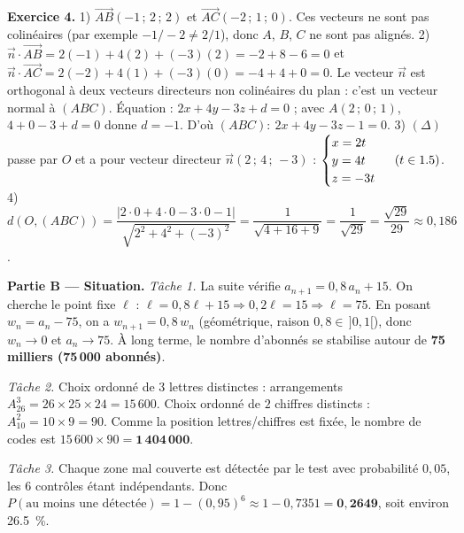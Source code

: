 \noindent\textbf{Exercice 4.}
1) $\vec{AB}(-1\,;\,2\,;\,2)$ et $\vec{AC}(-2\,;\,1\,;\,0)$. Ces vecteurs ne sont pas
colinéaires (par exemple $-1/-2\ne2/1$), donc $A$, $B$, $C$ ne sont pas alignés.
2) $\vec n\cdot\vec{AB}=2(-1)+4(2)+(-3)(2)=-2+8-6=0$ et
$\vec n\cdot\vec{AC}=2(-2)+4(1)+(-3)(0)=-4+4+0=0$. Le vecteur $\vec n$ est orthogonal à
deux vecteurs directeurs non colinéaires du plan : c'est un vecteur normal à $(ABC)$.
Équation : $2x+4y-3z+d=0$ ; avec $A(2\,;\,0\,;\,1)$, $4+0-3+d=0$ donne $d=-1$. D'où
$(ABC):\ 2x+4y-3z-1=0$.
3) $(\Delta)$ passe par $O$ et a pour vecteur directeur $\vec n(2\,;\,4\,;\,-3)$ :
$\begin{cases}x=2t\\ y=4t\\ z=-3t\end{cases}\ (t\in1.5)$.
4) $d(O,(ABC))=\dfrac{|2\cdot0+4\cdot0-3\cdot0-1|}{\sqrt{2^2+4^2+(-3)^2}}=\dfrac{1}{\sqrt{4+16+9}}=\dfrac{1}{\sqrt{29}}=\dfrac{\sqrt{29}}{29}\approx0{,}186$.

\smallskip
\noindent\textbf{Partie B — Situation.}
\emph{Tâche 1.} La suite vérifie $a_{n+1}=0{,}8\,a_n+15$. On cherche le point fixe $\ell$ :
$\ell=0{,}8\ell+15\Rightarrow0{,}2\ell=15\Rightarrow\ell=75$. En posant $w_n=a_n-75$, on a
$w_{n+1}=0{,}8\,w_n$ (géométrique, raison $0{,}8\in\,]0,1[$), donc $w_n\to0$ et
$a_n\to75$. À long terme, le nombre d'abonnés se stabilise autour de
\textbf{75 milliers (75\,000 abonnés)}.

\emph{Tâche 2.} Choix ordonné de $3$ lettres distinctes : arrangements $A_{26}^3=26\times25\times24=15\,600$.
Choix ordonné de $2$ chiffres distincts : $A_{10}^2=10\times9=90$. Comme la position
lettres/chiffres est fixée, le nombre de codes est $15\,600\times90=\mathbf{1\,404\,000}$.

\emph{Tâche 3.} Chaque zone mal couverte est détectée par le test avec probabilité $0{,}05$,
les $6$ contrôles étant indépendants. Donc
$P(\text{au moins une détectée})=1-(0{,}95)^6\approx1-0{,}7351=\mathbf{0{,}2649}$, soit environ \SI{26,5}{\percent}.

